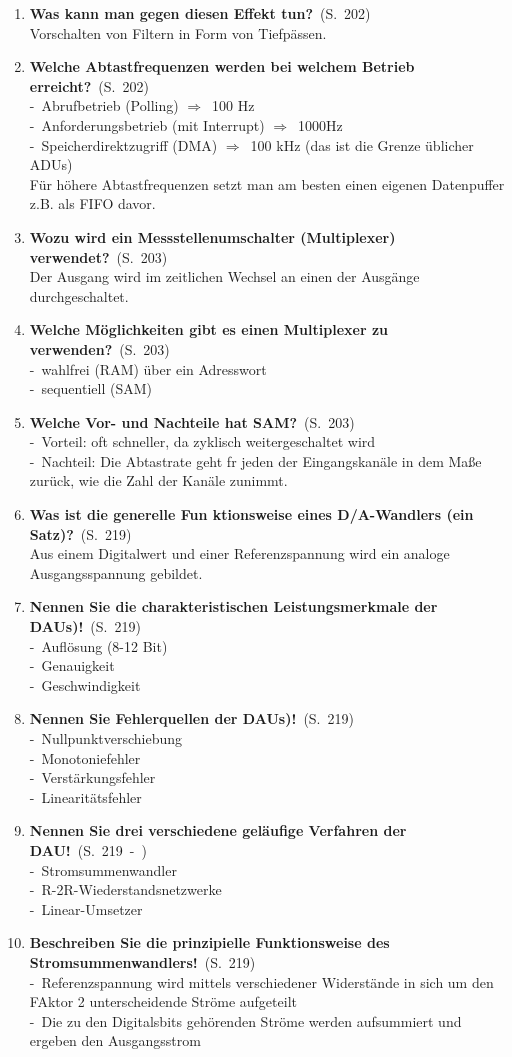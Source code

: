 \documentclass[a4paper,12pt]{article}
\newcommand{\question}[3]{\pagebreak[3]\item {\textbf{#1?}}\ (S.\ #2)#3}
\newcommand{\statement}[3]{\pagebreak[3]\item {\textbf{#1!}}\ (S.\ #2)#3}
\newcommand{\catchword}[1]{\\-\ #1}
\newcommand{\normaltext}[1]{\\#1}
\newcommand{\resultol}[1]{$\Rightarrow$\ #1}
\newcommand{\page}[1]{#1}
\newcommand{\pages}[2]{#1\ -\ #2}
\begin{document}
\begin{enumerate}
  \question{Was kann man gegen diesen Effekt tun}{\page{202}}
  {
    \normaltext{Vorschalten von Filtern in Form von Tiefpässen.}
  }

  \question{Welche Abtastfrequenzen werden bei welchem Betrieb erreicht}{\page{202}}
  {
    \catchword{Abrufbetrieb (Polling) \resultol{100 Hz}}
    \catchword{Anforderungsbetrieb (mit Interrupt) \resultol{1000Hz}}
    \catchword{Speicherdirektzugriff (DMA) \resultol 100 kHz (das ist die Grenze üblicher ADUs)}
    \normaltext{Für höhere Abtastfrequenzen setzt man am besten einen eigenen Datenpuffer z.B. als
    FIFO davor.}
  }

  \question{Wozu wird ein Messstellenumschalter (Multiplexer) verwendet}{\page{203}}
  {
    \normaltext{Der Ausgang wird im zeitlichen Wechsel an einen der Ausgänge durchgeschaltet.}
  }

  \question{Welche Möglichkeiten gibt es einen Multiplexer zu verwenden}{\page{203}}
  {
    \catchword{wahlfrei (RAM) über ein Adresswort}
    \catchword{sequentiell (SAM)}
  }

  \question{Welche Vor- und Nachteile hat SAM}{\page{203}}
  {
    \catchword{Vorteil: oft schneller, da zyklisch weitergeschaltet wird}
    \catchword{Nachteil: Die Abtastrate geht fr jeden der Eingangskanäle in dem Maße zurück, wie die Zahl der 
    Kanäle zunimmt.}
  }
  
  
   \question{Was ist die generelle Fun ktionsweise eines D/A-Wandlers (ein Satz)}{\page{219}}
  {
    \normaltext{Aus einem Digitalwert und einer Referenzspannung wird ein analoge Ausgangsspannung gebildet.}
  }
  
   \statement{Nennen Sie die charakteristischen Leistungsmerkmale der DAUs)}{\page{219}}
  {
    \catchword{Auflösung (8-12 Bit)}
    \catchword{Genauigkeit}
    \catchword{Geschwindigkeit}
    
  }
  
   \statement{Nennen Sie Fehlerquellen der DAUs)}{\page{219}}
  {
    \catchword{Nullpunktverschiebung}
    \catchword{Monotoniefehler}
    \catchword{Verstärkungsfehler}
    \catchword{Linearitätsfehler}
    
  }
  
   \statement{Nennen Sie drei verschiedene geläufige Verfahren der DAU}{\pages{219}{}}
  {
    \catchword{Stromsummenwandler}
    \catchword{R-2R-Wiederstandsnetzwerke}
    \catchword{Linear-Umsetzer}    
  }
  
   \statement{Beschreiben Sie die prinzipielle Funktionsweise des Stromsummenwandlers}{\page{219}}
  {
    \catchword{Referenzspannung wird mittels verschiedener Widerstände in sich um den FAktor 2 unterscheidende Ströme aufgeteilt}
    \catchword{Die zu den Digitalsbits gehörenden Ströme werden aufsummiert und ergeben den Ausgangsstrom}

}
\end{enumerate}
\end{document}
